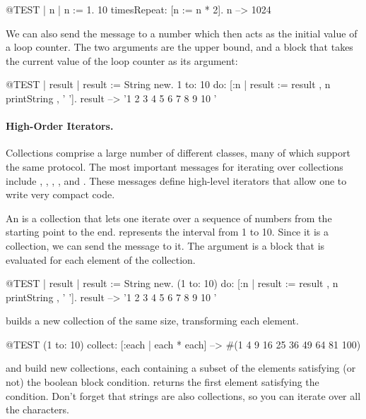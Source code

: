 \documentclass[a4paper,10pt,twoside]{book}
\begin{document}
\begin{code}{@TEST | n |}
n := 1.
10 timesRepeat: [n := n * 2].
n --> 1024
\end{code}

We can also send the message  to a number which then acts as the initial value of a loop counter.
The two arguments are the upper bound, and a block that takes the current value of the loop counter as its argument:

\begin{code}{@TEST | result |}
result := String new.
1 to: 10 do: [:n | result := result , n printString , ' '].
result --> '1 2 3 4 5 6 7 8 9 10 '
\end{code}

\paragraph{High-Order Iterators.}
Collections comprise a large number of different classes, many of which support the same protocol.
The most important messages for iterating over collections include
, , , ,  and .
These messages define high-level iterators that allow one to write very compact code.

An  is a collection that lets one iterate over a sequence of numbers from the starting point to the end.
 represents the interval from 1 to 10.
Since it is a collection, we can send the message  to it.
The argument is a block that is evaluated for each element of the collection.

\begin{code}{@TEST | result |}
result := String new.
(1 to: 10) do: [:n | result := result , n printString , ' '].
result --> '1 2 3 4 5 6 7 8 9 10 '
\end{code}

 builds a new collection of the same size, transforming each element.
\begin{code}{@TEST}
(1 to: 10) collect: [:each | each * each] --> #(1 4 9 16 25 36 49 64 81 100)
\end{code}

 and  build new collections, each containing a subset of the elements satisfying (or not) the boolean block condition.
 returns the first element satisfying the condition.
Don't forget that strings are also collections, so you can iterate over all the characters.
\end{document}
